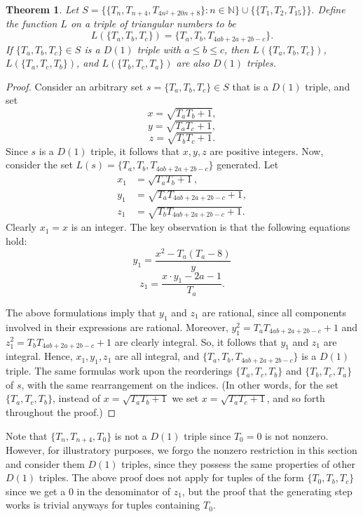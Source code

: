\documentclass[12pt]{amsart}
\theoremstyle{theorem}
\newtheorem{theorem}{Theorem}
\theoremstyle{definition}
\theoremstyle{plain}
\begin{document}
\begin{theorem}\label{proof of alg}
Let $S = \{ \{T_{n}, T_{n+4}, T_{4n^2 + 20n + 8} \}: n \in \mathbb{N} \} \cup \{ \{T_1, T_2, T_{15} \} \}.$ Define the function $L$ on a triple of triangular numbers to be $$L( \{T_a, T_b, T_c \}) = \{T_a, T_b, T_{4ab + 2a + 2b - c} \}.$$ 
If $\{T_a, T_b, T_c \} \in S$ is a $D(1)$ triple with $a \le b \le c$, then $L(\{T_a, T_b, T_c \})$, $L(\{T_a, T_c, T_b \})$, and $L(\{T_b, T_c, T_a \})$ are also $D(1)$ triples. 
\end{theorem}
\begin{proof}
    Consider an arbitrary set $s = \{T_a, T_b, T_c \} \in S$ that is a $D(1)$ triple, and set $$x = \sqrt{T_a T_b + 1},$$ $$y = \sqrt{T_a T_c + 1},$$ $$z = \sqrt{T_b T_c + 1}.$$ Since $s$ is a $D(1)$ triple, it follows that $x,y,z$ are positive integers. Now, consider the set $L(s) = \{T_a, T_b, T_{4ab + 2a + 2b - c} \}$ generated. Let 
    \begin{align*}
    x_1 &= \sqrt{T_a T_b + 1},\\
    y_1 &= \sqrt{T_a T_{4ab + 2a + 2b - c} + 1}, \\
    z_1 &= \sqrt{T_b T_{4ab + 2a + 2b - c} + 1}.
    \end{align*}
    Clearly $x_1 = x$ is an integer. The key observation is that the following equations hold: $$y_1 = \frac{x^2 - T_a (T_a - 8)}{y}$$ $$z_1 = \frac{x \cdot y_1 - 2a - 1}{T_a}.$$ 
    
    The above formulations imply that $y_1$ and $z_1$ are rational, since all components involved in their expressions are rational. Moreover, $y_1^2 = T_a T_{4ab + 2a + 2b - c} + 1$ and $z_1^2 = T_b T_{4ab + 2a + 2b - c} + 1$ are clearly integral. So, it follows that $y_1$ and $z_1$ are integral. Hence, $x_1, y_1, z_1$ are all integral, and $\{T_a, T_b, T_{4ab + 2a + 2b - c} \}$ is a $D(1)$ triple. The same formulas work upon the reorderings $\{T_a, T_c, T_b \}$ and $\{T_b, T_c, T_a \}$ of $s$, with the same rearrangement on the indices. (In other words, for the set $\{T_a, T_c, T_b \}$, instead of $x = \sqrt{T_a T_b + 1 }$ we set $x = \sqrt{T_a T_c + 1}$, and so forth throughout the proof.)
\end{proof}

 Note that $\{T_n, T_{n+4}, T_0 \}$ is not a $D(1)$ triple since $T_0 = 0$ is not nonzero. However, for illustratory purposes, we forgo the nonzero restriction in this section and consider them $D(1)$ triples, since they possess the same properties of other $D(1)$ triples. The above proof does not apply for tuples of the form $\{T_0, T_b, T_c \}$ since we get a $0$ in the denominator of $z_1$, but the proof that the generating step works is trivial anyways for tuples containing $T_0$.
 \\
 
\end{document}
